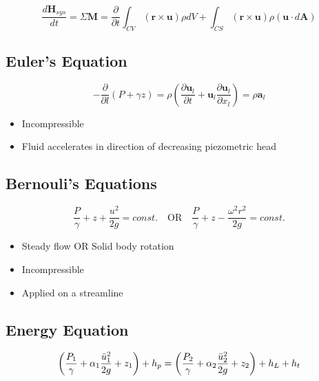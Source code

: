 \documentclass[twocolumn, 12pt]{article}
\begin{document}
{\begin{equation*}
    \frac{d\textbf{H}_{sys}}{dt} =\Sigma \textbf{M} = \frac{\partial}{\partial t} \int_{CV} (\textbf{r}\times \textbf{u})\rho dV + \int_{CS}(\textbf{r}\times \textbf{u})\rho (\textbf{u}\cdot d\textbf{A})
\end{equation*}

\subsection*{Euler's Equation}
\begin{equation*}
    -\frac{\partial}{\partial l}(P + \gamma z) = \rho \left(\frac{\partial \textbf{u}_l}{\partial t} + \textbf{u}_l\frac{\partial \textbf{u}_l}{\partial x_l}\right) = \rho \textbf{a}_l
\end{equation*}

{\footnotesize
\begin{itemize}
    \item Incompressible
    \item Fluid accelerates in direction of decreasing piezometric head
\end{itemize}
}

\subsection*{Bernouli's Equations}
\begin{equation*}
    \frac{P}{\gamma} + z + \frac{u^2}{2g}=const. \hspace{12pt} \text{OR} \hspace{12pt} \frac{P}{\gamma} + z -\frac{\omega^2r^2}{2g} = const.
\end{equation*}

{\footnotesize
\begin{itemize}
    \item Steady flow OR Solid body rotation
    \item Incompressible
    \item Applied on a streamline
\end{itemize}
}


%
\subsection*{Energy Equation}
\begin{equation*}
    \left(\frac{P_1}{\gamma}+\alpha_1\frac{\Bar{u}^2_1}{2g}+z_1\right) +h_p = \left(\frac{P_2}{\gamma}+\alpha_2\frac{\Bar{u}^2_2}{2g}+z_2\right) +h_L + h_t
\end{equation*}

}
\end{document}
